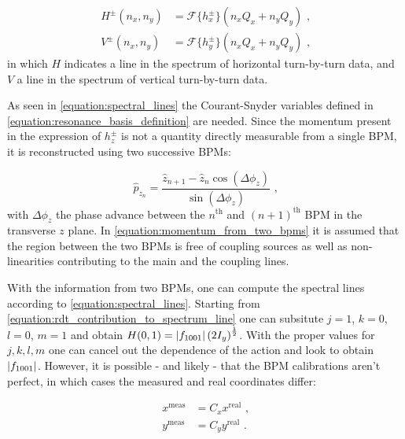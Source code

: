 \begin{equation}
  \begin{aligned}
    H^\pm(n_x, n_y) &= \mathcal{F}\{h_x^\pm\}(n_x Q_x + n_y Q_y)  \text{ ,}  \\
    V^\pm(n_x, n_y) &= \mathcal{F}\{h_y^\pm\}(n_x Q_x + n_y Q_y)  \text{ ,}
  \end{aligned}
  \label{equation:spectral_lines}
\end{equation}
in which \(H\) indicates a line in the spectrum of horizontal turn-by-turn data, and \(V\) a line in the spectrum of vertical turn-by-turn data.

As seen in \cref{equation:spectral_lines} the Courant-Snyder variables defined in \cref{equation:resonance_basis_definition} are needed.
Since the momentum present in the expression of \(h_z^\pm\) is not a quantity directly measurable from a single BPM, it is reconstructed using two successive BPMs:

\begin{equation}
  \hat{p}_{z_n} = \frac{\hat{z}_{n+1} - \hat{z}_n \cos \left(\Delta \phi_z\right)}{\sin \left(\Delta \phi_z\right)} \text{ ,}
  \label{equation:momentum_from_two_bpms}
\end{equation}
with \(\Delta \phi_z\) the phase advance between the \(n^{\mathrm{th}}\) and \((n+1)^{\mathrm{th}}\) BPM in the transverse \(z\) plane.
In \cref{equation:momentum_from_two_bpms} it is assumed that the region between the two BPMs is free of coupling sources as well as non-linearities contributing to the main and the coupling lines.

With the information from two BPMs, one can compute the spectral lines according to \cref{equation:spectral_lines}.
Starting from \cref{equation:rdt_contribution_to_spectrum_line} one can subsitute \(j = 1\), \(k = 0\), \(l = 0\), \(m = 1\) and obtain \(H(0, 1) = \left\lvert f_{1001} \right\rvert \left(2 I_y \right)^{\frac{1}{2}}\).
With the proper values for \(j,k,l,m\) one can cancel out the dependence of the action and look to obtain \(\left\lvert f_{1001} \right\rvert\).
However, it is possible - and likely - that the BPM calibrations aren't perfect, in which cases the measured and real coordinates differ:

\begin{equation}
  \begin{aligned}
    x^{\mathrm{meas}} &= C_x x^{\mathrm{real}}  \text{ ,}  \\
    y^{\mathrm{meas}} &= C_y y^{\mathrm{real}}  \text{ .}
  \end{aligned}
\end{equation}

